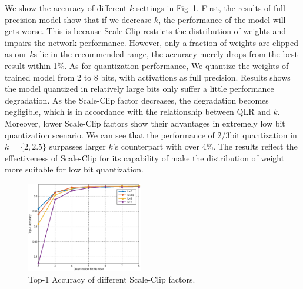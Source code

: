 \documentclass[letterpaper]{article} %
\begin{document}
We show the accuracy of different $k$ settings in Fig~\ref{fig:diffk}. First, the results of full precision model show that if we decrease $k$, the performance of the model will gets worse. This is because Scale-Clip restricts the distribution of weights and impairs the network performance. However, only a fraction of weights are clipped as our $k$s lie in the recommended range, the accuracy merely drops from the best result within 1\%. As for quantization performance, We quantize the weights of trained model from 2 to 8 bits, with activations as full precision. Results shows the model quantized in relatively large bits only suffer a little performance degradation. As the Scale-Clip factor decreases, the degradation becomes negligible, which is in accordance with the relationship between QLR and $k$. Moreover, lower Scale-Clip factors show their advantages in extremely low bit quantization scenario. We can see that the performance of 2/3bit quantization in $k=\{2,2.5\}$ surpasses larger $k$'s counterpart with over 4\%. The results reflect the effectiveness of Scale-Clip for its capability of make the distribution of weight more suitable for low bit quantization.

\begin{figure}[ht!]
	\includegraphics[width=0.45\textwidth]{acc.eps}
	\caption{Top-1 Accuracy of different Scale-Clip factors.}\label{fig:diffk}
\end{figure}


\end{document}
